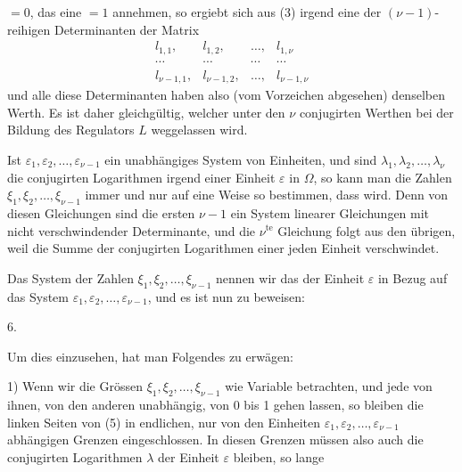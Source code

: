 $= 0$, das eine $= 1$ annehmen, so ergiebt sich aus (3) irgend eine der $(\nu-1)$-reihigen Determinanten der Matrix
\[
\begin{matrix}
l_{1,1}, & l_{1,2}, & \ldots, & l_{1,\nu} \\
\cdots & \cdots & \cdots & \cdots \\
l_{\nu-1,1}, & l_{\nu-1,2}, & \ldots, & l_{\nu-1,\nu}
\end{matrix}
\]
und alle diese Determinanten haben also (vom Vorzeichen abgesehen) denselben Werth. Es ist daher gleichg\"ultig, welcher unter den $\nu$ conjugirten Werthen bei der Bildung des Regulators $L$ weggelassen wird.

Ist $\varepsilon_1, \varepsilon_2, \ldots, \varepsilon_{\nu-1}$ ein unabh\"angiges System von Einheiten, und sind $\lambda_1, \lambda_2, \ldots, \lambda_\nu$ die conjugirten Logarithmen irgend einer Einheit $\varepsilon$ in $\Omega$, so kann man die Zahlen $\xi_1, \xi_2, \ldots, \xi_{\nu-1}$ immer und nur auf eine Weise so bestimmen, dass
wird. Denn von diesen Gleichungen sind die ersten $\nu - 1$ ein System linearer Gleichungen mit nicht verschwindender Determinante, und die $\nu^{\mathrm{te}}$ Gleichung folgt aus den \"ubrigen, weil die Summe der conjugirten Logarithmen einer jeden Einheit verschwindet.

Das System der Zahlen $\xi_1, \xi_2, \ldots, \xi_{\nu-1}$ nennen wir das  der Einheit $\varepsilon$ in Bezug auf das System $\varepsilon_1, \varepsilon_2, \ldots, \varepsilon_{\nu-1}$, und es ist nun zu beweisen:

6. 

Um dies einzusehen, hat man Folgendes zu erw\"agen:

1) Wenn wir die Gr\"ossen $\xi_1, \xi_2, \ldots, \xi_{\nu-1}$ wie Variable betrachten, und jede von ihnen, von den anderen unabh\"angig, von 0 bis 1 gehen lassen, so bleiben die linken Seiten von (5) in endlichen, nur von den Einheiten $\varepsilon_1, \varepsilon_2, \ldots, \varepsilon_{\nu-1}$ abh\"angigen Grenzen eingeschlossen. In diesen Grenzen m\"ussen also auch die conjugirten Logarithmen $\lambda$ der Einheit $\varepsilon$ bleiben, so lange
